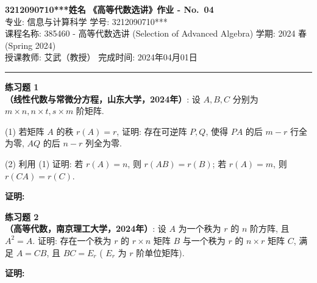 \documentclass[a4paper, 11pt]{article}
\newenvironment{problem}[2][练习题]
    { \begin{mdframed}[backgroundcolor=gray!5] \textbf{#1 #2} \\}
    {  \end{mdframed}}
\newenvironment{solution2}
    {\textbf{证明:}}
    {}
\begin{document}
\noindent
\large\textbf{3212090710***\quad 姓名} \hfill \textbf{《高等代数选讲》作业 - No.~\Huge{04}}   \\
专业: 信息与计算科学 \hfill 学号: 3212090710*** \\
\normalsize 课程名称: 385460 - 高等代数选讲 (Selection of Advanced Algebra) \hfill 学期: 2024 春 (Spring 2024)\\
授课教师: 艾武（教授） \hfill 完成时间: 2024年04月01日 \\
\noindent\rule{7in}{1.8pt}

\begin{problem}{1}
\textbf{（线性代数与常微分方程，山东大学，2024年）}: 设 $A, B, C$ 分别为 $m \times n, n \times t, s \times m$ 阶矩阵.

(1) 若矩阵 $A$ 的秩 $r(A)=r$, 证明: 存在可逆阵 $P, Q$, 使得 $P A$ 的后 $m-r$ 行全为零, $A Q$ 的后 $n-r$ 列全为零.

(2) 利用 (1) 证明: 若 $r(A)=n$, 则 $r(A B)=r(B)$; 若 $r(A)=m$, 则 $r(C A)=r(C)$.
\end{problem}

\begin{solution2}

\end{solution2} 


\begin{problem}{2}
\textbf{（高等代数，南京理工大学，2024年）}: 设 $A$ 为一个秩为 $r$ 的 $n$ 阶方阵, 且 $A^2=A$. 证明: 存在一个秩为 $r$ 的 $r \times n$ 矩阵 $B$ 与一个秩为 $r$ 的 $n \times r$ 矩阵 $C$, 满足 $A=C B$, 且 $B C=E_r$ ( $E_r$ 为 $r$ 阶单位矩阵).
\end{problem}

\begin{solution2}


\end{solution2} 





\end{document}
